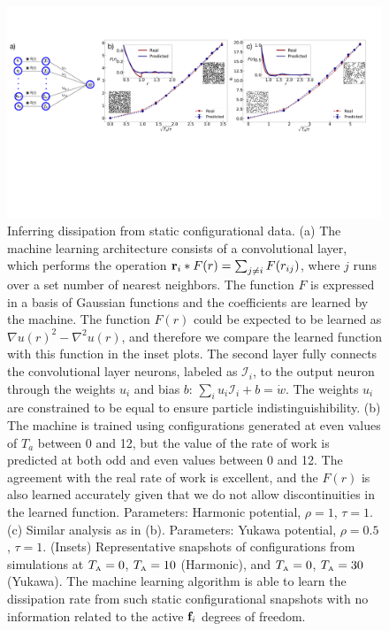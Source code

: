 \documentclass[superscriptaddress, twocolumn, prl, longbibliography, nofootinbib]{revtex4-1}
\newcommand{\A}{\text{\tiny{A}}}
\begin{document}
\begin{figure}[t]
\centering
    \includegraphics[scale=0.27, clip=True]{Fig_ML_cut.pdf}
    \caption {Inferring dissipation from static configurational data. (a) The machine learning architecture consists of a convolutional layer, which performs the operation ${\bf r}_i * F(r) = \sum_{j \neq i} F(r_{ij})$, where $j$ runs over a set number of nearest neighbors. The function $F$ is expressed in a basis of Gaussian functions and the coefficients are learned by the machine. The function $F(r)$ could be expected to be learned as $\nabla u(r)^2 - \nabla^2 u(r)$, and therefore we compare the learned function with this function in the inset plots. The second layer fully connects the convolutional layer neurons, labeled as $\mathcal{I}_i$, to the output neuron through the weights $u_i$ and bias $b$:  $\sum_i u_i {\mathcal{I}_i} +b = \dot{w}$. The weights $u_i$ are constrained to be equal to ensure particle indistinguishibility. (b) The machine is trained using configurations generated at even values of $T_a$ between 0 and 12, but the value of the rate of work is predicted at both odd and even values between 0 and 12. The agreement with the real rate of work is excellent, and the $F(r)$ is also learned accurately given that we do not allow discontinuities in the learned function. Parameters: Harmonic potential, $\rho = 1$, $\tau = 1$. (c) Similar analysis as in (b). Parameters: Yukawa potential, $\rho = 0.5$, $\tau = 1$. (Insets) Representative snapshots of configurations from simulations at $T_\A=0$, $T_\A=10$ (Harmonic), and $T_\A=0$, $T_\A=30$ (Yukawa). The machine learning algorithm is able to learn the dissipation rate from such static configurational snapshots with no information related to the active ${\bf f}_i$ degrees of freedom.}
    \label{Fig:ML}
\end{figure}
\end{document}
